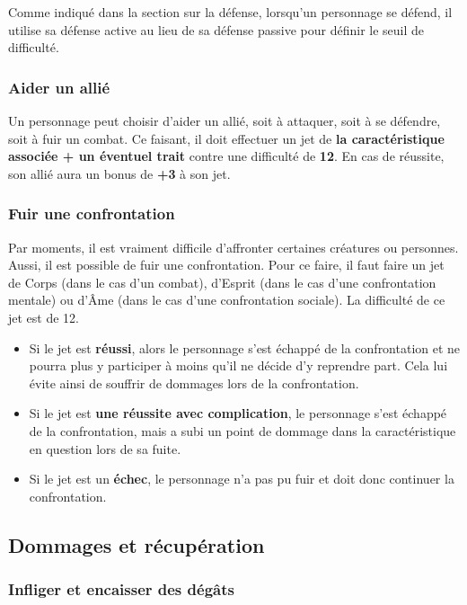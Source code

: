 Comme indiqué dans la section sur la défense, lorsqu'un personnage se défend, il utilise sa défense active au lieu de sa défense passive pour définir le seuil de difficulté.

\subsubsection*{Aider un allié}

Un personnage peut choisir d'aider un allié, soit à attaquer, soit à se défendre, soit à fuir un combat. Ce faisant, il doit effectuer un jet de \textbf{la caractéristique associée + un éventuel trait} contre une difficulté de \textbf{12}. En cas de réussite, son allié aura un bonus de \textbf{+3} à son jet.

\subsubsection*{Fuir une confrontation}

Par moments, il est vraiment difficile d'affronter certaines créatures ou personnes. Aussi, il est possible de fuir une confrontation. Pour ce faire, il faut faire un jet de Corps (dans le cas d'un combat), d'Esprit (dans le cas d'une confrontation mentale) ou d'Âme (dans le cas d'une confrontation sociale). La difficulté de ce jet est de 12.

\begin{itemize}
\item Si le jet est \textbf{réussi}, alors le personnage s'est échappé de la confrontation et ne pourra plus y participer à moins qu'il ne décide d'y reprendre part. Cela lui évite ainsi de souffrir de dommages lors de la confrontation.
\item Si le jet est \textbf{une réussite avec complication}, le personnage s'est échappé de la confrontation, mais a subi un point de dommage dans la caractéristique en question lors de sa fuite.
\item Si le jet est un \textbf{échec}, le personnage n'a pas pu fuir et doit donc continuer la confrontation.
\end{itemize}

\subsection{Dommages et récupération}

\subsubsection*{Infliger et encaisser des dégâts}

